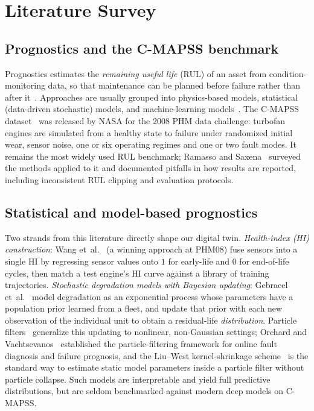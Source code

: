 \section{Literature Survey}
\label{sec:related}

\subsection{Prognostics and the C-MAPSS benchmark}
Prognostics estimates the \emph{remaining useful life} (RUL) of an asset from
condition-monitoring data, so that maintenance can be planned before failure
rather than after it~\cite{jardine2006review,lei2018review}. Approaches are
usually grouped into physics-based models, statistical (data-driven stochastic)
models, and machine-learning models~\cite{si2011review,lei2018review}.
The C-MAPSS dataset~\cite{saxena2008damage} was released by NASA for the 2008
PHM data challenge: turbofan engines are simulated from a healthy state to
failure under randomized initial wear, sensor noise, one or six operating
regimes and one or two fault modes. It remains the most widely used
RUL benchmark; Ramasso and Saxena~\cite{ramasso2014benchmark} surveyed the
methods applied to it and documented pitfalls in how results are reported,
including inconsistent RUL clipping and evaluation protocols.

\subsection{Statistical and model-based prognostics}
Two strands from this literature directly shape our digital twin.
\emph{Health-index (HI) construction}: Wang et~al.~\cite{wang2008similarity}
(a winning approach at PHM08) fuse sensors into a single HI by regressing
sensor values onto $1$ for early-life and $0$ for end-of-life cycles, then
match a test engine's HI curve against a library of training trajectories.
\emph{Stochastic degradation models with Bayesian updating}: Gebraeel
et~al.~\cite{gebraeel2005residual} model degradation as an exponential process
whose parameters have a population prior learned from a fleet, and update that
prior with each new observation of the individual unit to obtain a
residual-life \emph{distribution}. Particle filters~\cite{arulampalam2002tutorial}
generalize this updating to nonlinear, non-Gaussian settings; Orchard and
Vachtsevanos~\cite{orchard2009particle} established the particle-filtering
framework for online fault diagnosis and failure prognosis, and the
Liu--West kernel-shrinkage scheme~\cite{liu2001combined} is the standard way to
estimate static model parameters inside a particle filter without particle
collapse. Such models are interpretable and yield full predictive
distributions, but are seldom benchmarked against modern deep models on
C-MAPSS.

